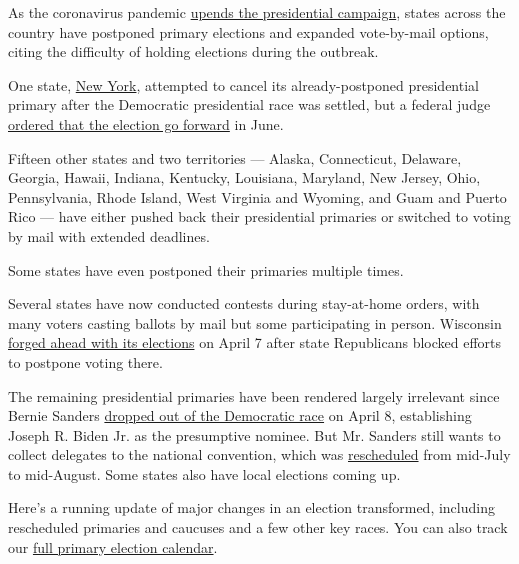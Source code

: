 As the coronavirus pandemic
\href{https://www.nytimes.com/2020/03/12/us/politics/coronavirus-2020-campaign.html}{upends
the presidential campaign}, states across the country have postponed
primary elections and expanded vote-by-mail options, citing the
difficulty of holding elections during the outbreak.

One state,
\href{https://www.nytimes.com/2020/06/30/nyregion/ny-house-primaries.html}{New
York}, attempted to cancel its already-postponed presidential primary
after the Democratic presidential race was settled, but a federal judge
\href{https://www.nytimes.com/2020/05/05/us/politics/ny-presidential-primary.html}{ordered
that the election go forward} in June.

Fifteen other states and two territories --- Alaska, Connecticut,
Delaware, Georgia, Hawaii, Indiana, Kentucky, Louisiana, Maryland, New
Jersey, Ohio, Pennsylvania, Rhode Island, West Virginia and Wyoming, and
Guam and Puerto Rico --- have either pushed back their presidential
primaries or switched to voting by mail with extended deadlines.

Some states have even postponed their primaries multiple times.

Several states have now conducted contests during stay-at-home orders,
with many voters casting ballots by mail but some participating in
person. Wisconsin
\href{https://www.nytimes.com/2020/04/07/us/politics/wisconsin-election-coronavirus.html}{forged
ahead with its elections} on April 7 after state Republicans blocked
efforts to postpone voting there.

The remaining presidential primaries have been rendered largely
irrelevant since Bernie Sanders
\href{https://www.nytimes.com/2020/04/08/us/politics/bernie-sanders-drops-out.html}{dropped
out of the Democratic race} on April 8, establishing Joseph R. Biden Jr.
as the presumptive nominee. But Mr. Sanders still wants to collect
delegates to the national convention, which was
\href{https://www.nytimes.com/2020/04/02/us/politics/milwaukee-democratic-convention-delayed.html}{rescheduled}
from mid-July to mid-August. Some states also have local elections
coming up.

Here's a running update of major changes in an election transformed,
including rescheduled primaries and caucuses and a few other key races.
You can also track our
\href{https://www.nytimes.com/interactive/2019/us/elections/2020-presidential-election-calendar.html}{full
primary election calendar}.

\subsubsection{}

